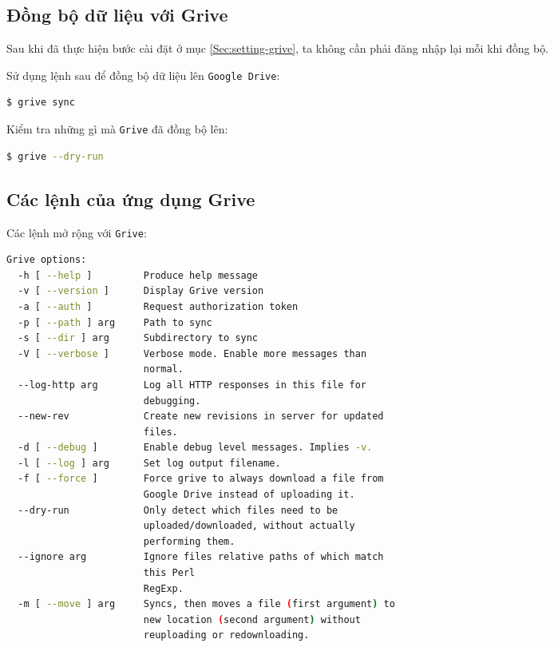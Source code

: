 \subsection{Đồng bộ dữ liệu với Grive}
\begin{list}{--}{}
\item Sau khi đã thực hiện bước cài đặt ở mục  \ref{Sec:setting-grive}, ta không cần phải đăng nhập lại mỗi khi đồng bộ.
\item Sử dụng lệnh sau để đồng bộ dữ liệu lên \verb|Google Drive|:
\begin{lstlisting}[language=bash]
$ grive sync
\end{lstlisting}
\item Kiểm tra những gì mà \verb|Grive| đã đồng bộ lên:
\begin{lstlisting}[language=bash]
$ grive --dry-run
\end{lstlisting}
\end{list}
\newpage
\subsection{Các lệnh của ứng dụng Grive}
\begin{list}{--}{}
\item[] Các lệnh mở rộng với \verb|Grive|:
\begin{lstlisting}[language=bash]
Grive options:
  -h [ --help ]         Produce help message
  -v [ --version ]      Display Grive version
  -a [ --auth ]         Request authorization token
  -p [ --path ] arg     Path to sync
  -s [ --dir ] arg      Subdirectory to sync
  -V [ --verbose ]      Verbose mode. Enable more messages than 
                        normal.
  --log-http arg        Log all HTTP responses in this file for 
                        debugging.
  --new-rev             Create new revisions in server for updated 
                        files.
  -d [ --debug ]        Enable debug level messages. Implies -v.
  -l [ --log ] arg      Set log output filename.
  -f [ --force ]        Force grive to always download a file from 
                        Google Drive instead of uploading it.
  --dry-run             Only detect which files need to be 
                        uploaded/downloaded, without actually 
                        performing them.
  --ignore arg          Ignore files relative paths of which match 
                        this Perl 
                        RegExp.
  -m [ --move ] arg     Syncs, then moves a file (first argument) to                                     
                        new location (second argument) without 
                        reuploading or redownloading.

\end{lstlisting}
\end{list}